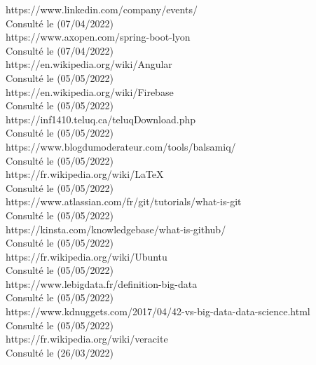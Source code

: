 \documentclass[12pt]{report}
\begin{document}
\begin{thebibliography}{99}
 https://www.linkedin.com/company/events/
			\\Consulté le (07/04/2022)\\


 https://www.axopen.com/spring-boot-lyon
			\\Consulté le (07/04/2022)\\
			

 https://en.wikipedia.org/wiki/Angular
			\\Consulté le (05/05/2022)\\


 https://en.wikipedia.org/wiki/Firebase
			\\Consulté le (05/05/2022)\\


 https://inf1410.teluq.ca/teluqDownload.php
			\\Consulté le (05/05/2022)\\
			

 https://www.blogdumoderateur.com/tools/balsamiq/
			\\Consulté le (05/05/2022)\\
			

 https://fr.wikipedia.org/wiki/LaTeX
			\\Consulté le (05/05/2022)\\


 https://www.atlassian.com/fr/git/tutorials/what-is-git
			\\Consulté le (05/05/2022)\\


 https://kinsta.com/knowledgebase/what-is-github/
			\\Consulté le (05/05/2022)\\


 https://fr.wikipedia.org/wiki/Ubuntu
			\\Consulté le (05/05/2022)\\


 https://www.lebigdata.fr/definition-big-data
			\\Consulté le (05/05/2022)\\


 https://www.kdnuggets.com/2017/04/42-vs-big-data-data-science.html
			\\Consulté le (05/05/2022)\\


 https://fr.wikipedia.org/wiki/veracite
			\\Consulté le (26/03/2022)\\



\end{thebibliography}
\end{document}
